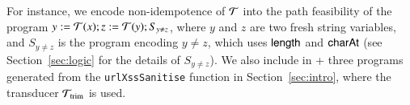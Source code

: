 %
For instance, we encode non-idempotence of $\mathcal{T}$ into the path feasibility of the {\slint} program $y:=\mathcal{T}(x); z:=\mathcal{T}(y); S_{y \neq z}$, where $y$ and $z$ are two fresh string variables, and $S_{y \neq z}$ is the {\slint} program encoding $y \neq z$, which uses $\mathsf{length}$ and $\mathsf{charAt}$ (see Section~\ref{sec:logic} for the details of $S_{y \neq z}$). We also include in {\transducerbench+} three {\slint} programs generated from the {\tt urlXssSanitise} function in Section~\ref{sec:intro}, %
where the transducer $\mathcal{T}_{\rm trim}$ is used. 
%
%
%
%

\paragraph*{\slogbench}

